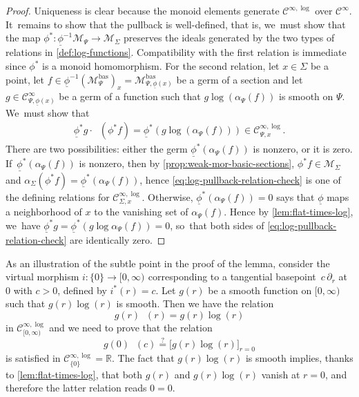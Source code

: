 \documentclass[JEP,XML,SOM,Unicode,NoFloatCountersInSection,published]{cedram}
\theoremstyle{definition}
\theoremstyle{remark}
\newenvironment{example}
  {\pushQED{\qed}\renewcommand{\qedsymbol}{$\lozenge$}\examplex}
  {\popQED\endexamplex}
\newcommand{\RR}{\mathbb{R}}
\newcommand{\halfspc}[1]{[0,\infty)^{#1}}
\newcommand{\ulog}{\mathop{\widetilde{\log}}\nolimits}
\newcommand{\rbrac}[1]{\left(#1\right)}
\newcommand{\cM}{\mathscr{M}}
\newcommand{\cMbas}{\mathscr{M}^{\mathrm{bas}}}
\newcommand{\Cinf}[1]{\mathscr{C}^{\infty}_{#1}}
\newcommand{\Cinflog}[1]{\mathscr{C}^{\infty,\log}_{#1}}
\newcommand{\cvf}[1]{\partial_{#1}}
\newcommand{\Sig}{\Sigma}
\newcommand{\uphi}{\underline{\phi}}
\begin{document}
\begin{proof}
Uniqueness is clear because the monoid elements generate $\Cinflog{}$ over $\Cinf{}$. It~remains to show that the pullback is well-defined, that is, we~must show that the map $\phi^*\colon \uphi^{-1}\cM_{\Psi} \to \cM_\Sig$ preserves the ideals generated by the two types of relations in \autoref{def:log-functions}. Compatibility with the first relation is immediate since $\phi^*$ is a monoid homomorphism. For the second relation, let $x \in \Sig$ be a point, let $f \in \uphi^{-1}(\cMbas_{\Psi})_x = \cMbas_{\Psi,\uphi(x)}$ be a germ of a section and let $g \in \Cinf{\Psi,\uphi(x)}$ be a germ of a function such that $g \log(\alpha_\Psi(f))$ is smooth on $\Psi$. We~must show that
\begin{align}\label{eq:log-pullback-relation-check}
\uphi^*g\cdot \ulog(\phi^*f) = \uphi^*\rbrac{g\log\rbrac{\alpha_\Psi(f)}} \in \Cinflog{\Psi,x}.
\end{align}
There are two possibilities: either the germ $\uphi^*(\alpha_{\Psi}(f))$ is nonzero, or it is zero. If~$\uphi^*(\alpha_{\Psi}(f))$ is nonzero, then by \autoref{prop:weak-mor-basic-sections}, $\phi^*f\!\in\! \cM_\Sig$ and $\alpha_{\Sig}(\phi^*f)\!=\!\uphi^*(\alpha_\Psi(f))$, hence \eqref{eq:log-pullback-relation-check} is one of the defining relations for $\Cinflog{\Sig,x}$. Otherwise, $\uphi^*(\alpha_\Psi(f)) = 0$ says that $\uphi$ maps a neighborhood of $x$ to the vanishing set of $\alpha_\Psi(f)$. Hence by \autoref{lem:flat-times-log}, we~have $\uphi^*g = \uphi^*(g \log \alpha_\Psi(f)) =0$, so~that both sides of \eqref{eq:log-pullback-relation-check} are identically zero.
\end{proof}

\begin{example}
As an illustration of the subtle point in the proof of the lemma, consider the virtual morphism $i\colon\{0\}\to \halfspc{}$ corresponding to a tangential basepoint~$c\,\cvf{r}$ at $0$ with $c>0$, \ie defined by $i^*(r)=c$. Let $g(r)$ be a smooth function on $\halfspc{}$ such that $g(r)\log(r)$ is smooth. Then we have the relation
\[
g(r)\ulog(r)=g(r)\log(r)
\]
in $\Cinflog{\halfspc{}}$ and we need to prove that the relation
\[
g(0)\ulog(c)\stackrel{?}{=}\big[g(r)\log(r)\big]_{r=0}
\]
is satisfied in $\Cinflog{\{0\}}=\RR$. The fact that $g(r)\log(r)$ is smooth implies, thanks to \autoref{lem:flat-times-log}, that both $g(r)$ and $g(r)\log(r)$ vanish at $r=0$, and therefore the latter relation reads $0=0$.
\end{example}
\end{document}
